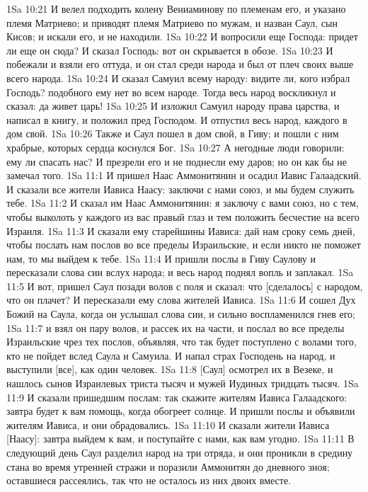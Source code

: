 1Sa 10:21  И велел подходить колену Вениаминову по племенам его, и указано племя Матриево; и приводят племя Матриево по мужам, и назван Саул, сын Кисов; и искали его, и не находили.
1Sa 10:22  И вопросили еще Господа: придет ли еще он сюда? И сказал Господь: вот он скрывается в обозе.
1Sa 10:23  И побежали и взяли его оттуда, и он стал среди народа и был от плеч своих выше всего народа.
1Sa 10:24  И сказал Самуил всему народу: видите ли, кого избрал Господь? подобного ему нет во всем народе. Тогда весь народ воскликнул и сказал: да живет царь!
1Sa 10:25  И изложил Самуил народу права царства, и написал в книгу, и положил пред Господом. И отпустил весь народ, каждого в дом свой.
1Sa 10:26  Также и Саул пошел в дом свой, в Гиву; и пошли с ним храбрые, которых сердца коснулся Бог.
1Sa 10:27  А негодные люди говорили: ему ли спасать нас? И презрели его и не поднесли ему даров; но он как бы не замечал того.
1Sa 11:1  И пришел Наас Аммонитянин и осадил Иавис Галаадский. И сказали все жители Иависа Наасу: заключи с нами союз, и мы будем служить тебе.
1Sa 11:2  И сказал им Наас Аммонитянин: я заключу с вами союз, но с тем, чтобы выколоть у каждого из вас правый глаз и тем положить бесчестие на всего Израиля.
1Sa 11:3  И сказали ему старейшины Иависа: дай нам сроку семь дней, чтобы послать нам послов во все пределы Израильские, и если никто не поможет нам, то мы выйдем к тебе.
1Sa 11:4  И пришли послы в Гиву Саулову и пересказали слова сии вслух народа; и весь народ поднял вопль и заплакал.
1Sa 11:5  И вот, пришел Саул позади волов с поля и сказал: что [сделалось] с народом, что он плачет? И пересказали ему слова жителей Иависа.
1Sa 11:6  И сошел Дух Божий на Саула, когда он услышал слова сии, и сильно воспламенился гнев его;
1Sa 11:7  и взял он пару волов, и рассек их на части, и послал во все пределы Израильские чрез тех послов, объявляя, что так будет поступлено с волами того, кто не пойдет вслед Саула и Самуила. И напал страх Господень на народ, и выступили [все], как один человек.
1Sa 11:8  [Саул] осмотрел их в Везеке, и нашлось сынов Израилевых триста тысяч и мужей Иудиных тридцать тысяч.
1Sa 11:9  И сказали пришедшим послам: так скажите жителям Иависа Галаадского: завтра будет к вам помощь, когда обогреет солнце. И пришли послы и объявили жителям Иависа, и они обрадовались.
1Sa 11:10  И сказали жители Иависа [Наасу]: завтра выйдем к вам, и поступайте с нами, как вам угодно.
1Sa 11:11  В следующий день Саул разделил народ на три отряда, и они проникли в средину стана во время утренней стражи и поразили Аммонитян до дневного зноя; оставшиеся рассеялись, так что не осталось из них двоих вместе.
